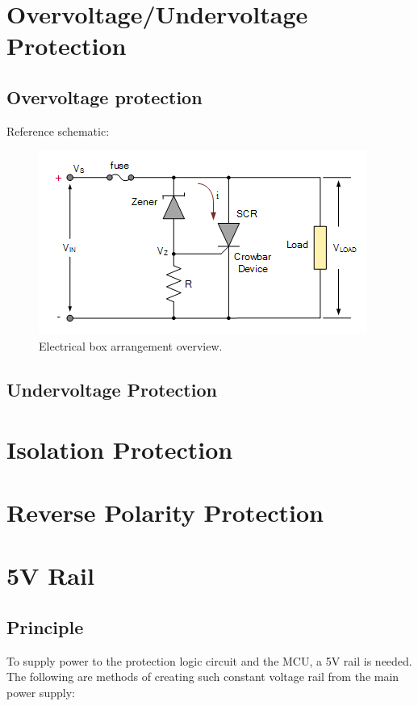 \documentclass[main.tex]{subfiles}
\begin{document}
    
    \pagebreak

    \section{Overvoltage/Undervoltage Protection}

    \subsection{Overvoltage protection}

    \justify
    Reference schematic:

    \begin{figure}[!h]
        \centerline{\includegraphics[scale=0.5]{media/Zener_Crowbar_OVP.png}}
        \caption{Electrical box arrangement overview.}
        \label{fig:enclosure_arrange}
    \end{figure}

    \subsection{Undervoltage Protection}
    
    \section{Isolation Protection}

    \section{Reverse Polarity Protection}

    \pagebreak

    \section{5V Rail}

    \subsection{Principle}
    \justify
    To supply power to the protection logic circuit and the MCU, a 5V rail is needed. The following are methods of creating such constant voltage rail from the main power supply:
\end{document}
